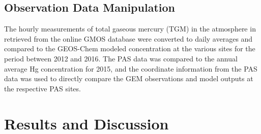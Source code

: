 \subsection{ Observation Data Manipulation}
\begin{flushleft}
The hourly measurements of total gaseous mercury (TGM) in the atmosphere in \nang retrieved from the online GMOS database were converted to daily averages and compared to the GEOS-Chem modeled \hg concentration at the various sites for the period between 2012 and 2016.  The PAS data was compared to the annual average Hg concentration for 2015, and the coordinate information from the PAS data was used to directly compare the GEM observations and model outputs at the respective PAS sites.
\end{flushleft}
\begin{table}[H]
\label{tab:ASGM_at_GMOS_annual_avs}

\centering
{}

\end{table}

\section{Results and Discussion}
